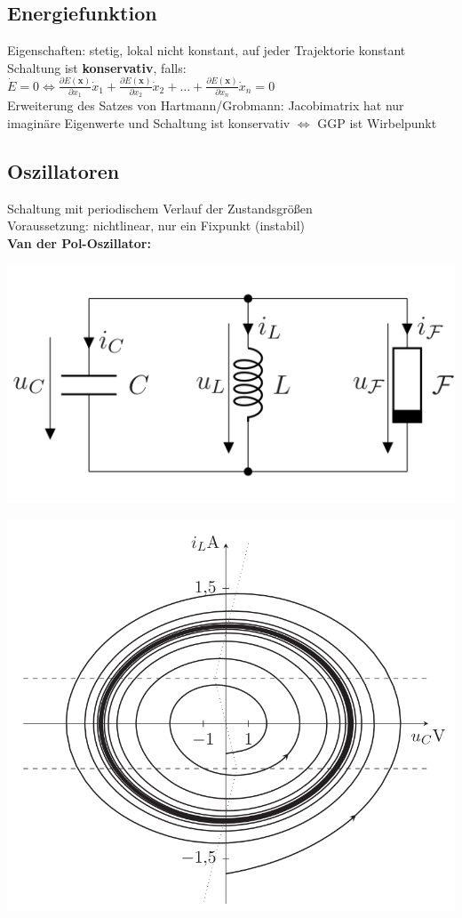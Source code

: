 \documentclass[fs, footer]{latex4ei}
\begin{document}
\begin{multicols*}{4}
\subsection{Energiefunktion}
Eigenschaften: stetig, lokal nicht konstant, auf jeder Trajektorie konstant\\
Schaltung ist \textbf{konservativ}, falls:\\
$\dot{E} = 0 \Leftrightarrow \frac{\partial E(\mathbf{x})}{\partial x_1} \dot{x}_1 + \frac{\partial E(\mathbf{x})}{\partial x_2} \dot{x}_2 + \hdots + \frac{\partial E(\mathbf{x})}{\partial x_n} \dot{x}_n = 0$\\
Erweiterung des Satzes von Hartmann/Grobmann: Jacobimatrix hat nur imaginäre Eigenwerte und Schaltung ist konservativ $\Leftrightarrow$ GGP ist Wirbelpunkt
\subsection{Oszillatoren}
Schaltung mit periodischem Verlauf der Zustandsgrößen\\
Voraussetzung: nichtlinear, nur ein Fixpunkt (instabil)\\
\textbf{Van der Pol-Oszillator:}\\
\parbox{.5\linewidth}{\includegraphics[width=\linewidth]{img/van-der-pol}}
\parbox{.5\linewidth}{\includegraphics[width=\linewidth]{img/fast-harmonischer-oszillator}}\\

\end{multicols*}
\end{document}
